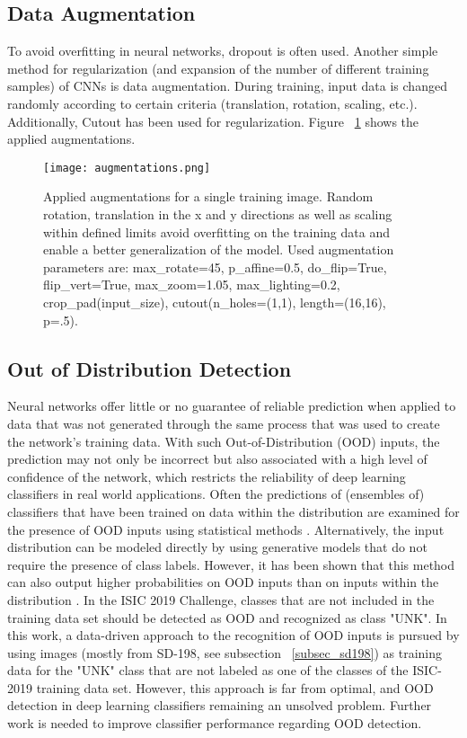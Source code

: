 \documentclass[journal]{IEEEtran}
\begin{document}
\subsection{Data Augmentation}
To avoid overfitting \cite{hinton2012improving} in neural networks, dropout \cite{srivastava2014dropout} is often used. Another simple method for regularization (and expansion of the number of different training samples) of CNNs is data augmentation. During training, input data is changed randomly according to certain criteria (translation, rotation, scaling, etc.). Additionally, Cutout \cite{devries2017improved} has been used for regularization. Figure ~\ref{augmentations} shows the applied augmentations.
\begin{figure}[!t]
\centering
\texttt{[image: augmentations.png]}
\caption{Applied augmentations for a single training image. Random rotation, translation in the x and y directions as well as scaling within defined limits avoid overfitting on the training data and enable a better generalization of the model. Used augmentation parameters are: max\_rotate=45, p\_affine=0.5, do\_flip=True, flip\_vert=True, max\_zoom=1.05, max\_lighting=0.2, crop\_pad(input\_size), cutout(n\_holes=(1,1), length=(16,16), p=.5).}
\label{augmentations}
\end{figure}

\subsection{Out of Distribution Detection} \label{subsec_ood}
Neural networks offer little or no guarantee of reliable prediction when applied to data that was not generated through the same process that was used to create the network's training data. With such Out-of-Distribution (OOD) inputs, the prediction may not only be incorrect but also associated with a high level of confidence \cite{goodfellow2014explaining, nguyen2015deep} of the network, which restricts the reliability of deep learning classifiers in real world applications. Often the predictions of (ensembles of) classifiers that have been trained on data within the distribution are examined for the presence of OOD inputs using statistical methods \cite{hendrycks2016baseline, lakshminarayanan2017simple}. Alternatively, the input distribution can be modeled directly by using generative models that do not require the presence of class labels. However, it has been shown that this method can also output higher probabilities on OOD inputs than on inputs within the distribution \cite{ren2019likelihood}. In the ISIC 2019 Challenge, classes that are not included in the training data set should be detected as OOD and recognized as class "UNK". In this work, a data-driven approach to the recognition of OOD inputs is pursued by using images (mostly from SD-198, see subsection ~\ref{subsec_sd198}) as training data for the "UNK" class that are not labeled as one of the classes of the ISIC-2019 training data set. However, this approach is far from optimal, and OOD detection in deep learning classifiers remaining an unsolved problem. Further work is needed to improve classifier performance regarding OOD detection.
\end{document}
